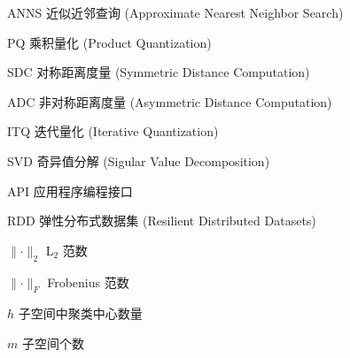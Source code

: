 \begin{denotation}

\item[ANNS] 近似近邻查询 (Approximate Nearest Neighbor Search)
\item[PQ] 乘积量化 (Product Quantization)
\item[SDC] 对称距离度量 (Symmetric Distance Computation)
\item[ADC] 非对称距离度量 (Asymmetric Distance Computation)
\item[ITQ] 迭代量化 (Iterative Quantization)
\item[SVD] 奇异值分解 (Sigular Value Decomposition)
\item[API] 应用程序编程接口
\item[RDD] 弹性分布式数据集 (Resilient Distributed Datasets)
\item[$\lVert\cdot\rVert_2$] L$_2$ 范数
\item[$\lVert\cdot\rVert_F$] Frobenius 范数
\item[$h$] 子空间中聚类中心数量
\item[$m$] 子空间个数
\end{denotation}
